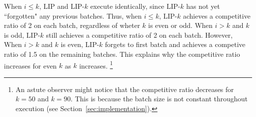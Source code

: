 When $i \leq k$, LIP and LIP-$k$ execute identically, since LIP-$k$ has not yet ``forgotten" any previous batches. 
Thus, when $i \leq k$, LIP-$k$ achieves a competitive ratio of 2 on each batch, regardless of wheter $k$ is even or odd.
When $i > k$ and $k$ is odd, LIP-$k$ still achieves a competitive ratio of 2 on each batch.
However, When $i > k$ and $k$ is even, LIP-$k$ forgets to first batch and achieves a competive ratio of 1.5 on the remaining batches.
This explains why the competitive ratio increases for even $k$ as $k$ increases.
\footnote{An astute observer might notice that the competitive ratio decreases for $k = 50$ and $k = 90$. This is because the batch size is not constant throughout execution (see Section~\ref{sec:implementation}).}



